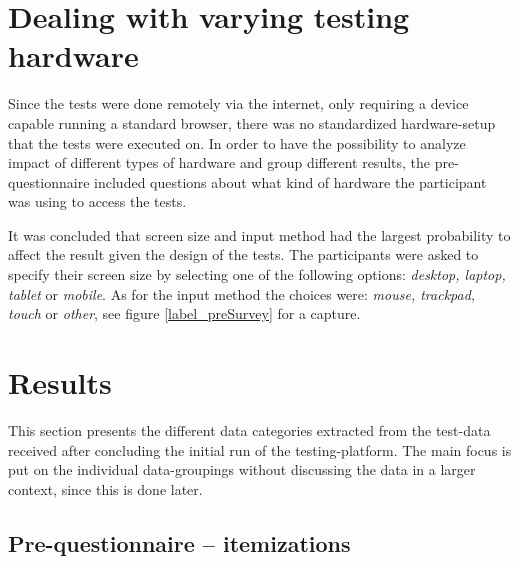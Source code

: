 

\section{Dealing with varying testing hardware}\label{label_testingHardware}

  Since the tests were done remotely via the internet, only requiring a
  device capable running a standard browser, there was no standardized
  hardware-setup that the tests were executed on. In order to have the
  possibility to analyze impact of different types of hardware and group
  different results, the pre-questionnaire included questions about what
  kind of hardware the participant was using to access the tests.

  It was concluded that screen size and input method had the largest
  probability to affect the result given the design of the tests.
  The participants were asked to specify their screen size by selecting one
  of the following options: \textit{desktop, laptop, tablet} or
  \textit{mobile}. As for the input method the choices were:
  \textit{mouse, trackpad, touch} or \textit{other}, see figure
  \ref{label_preSurvey} for a capture.


\section{Results}


  This section presents the different data categories extracted from the
  test-data received after concluding the initial run of the testing-platform.
  The main focus is put on the individual data-groupings without discussing the
  data in a larger context, since this is done later.

  \subsection{Pre-questionnaire -- itemizations}

